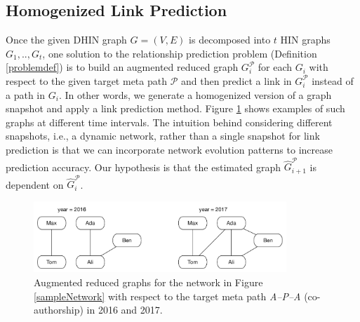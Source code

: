 
\subsection{Homogenized Link Prediction}\label{def:HLP}

Once the given DHIN graph $G=(V,E)$ is decomposed into $t$ HIN graphs $G_1, .., G_t$, one solution to the relationship prediction problem (Definition \ref{problemdef}) is to build an augmented reduced graph $G_i^\mathcal{P}$ for each $G_i$ with respect to the given target meta path $\mathcal{P}$ and then predict a link in $G_i^\mathcal{P}$ instead of a path in $G_i$. In other words, we generate a homogenized version of a graph snapshot and apply a link prediction method. Figure \ref{targetARG} shows examples of such graphs at different time intervals. The intuition behind considering different snapshots, i.e., a dynamic network, rather than a single snapshot for link prediction is that we can incorporate network evolution patterns to increase prediction accuracy. Our hypothesis is that the estimated graph $\hat{G}_{i+1}^\mathcal{P}$ is dependent on $\hat{G}_i^\mathcal{P}$. 

\begin{figure}[t]
\centering
\includegraphics[trim = 0mm 5mm 0mm 0mm,width=0.85\textwidth]{figs/exampletargetARG.pdf}
\caption{Augmented reduced graphs for the network in Figure \ref{sampleNetwork} with respect to the target meta path \textit{A--P--A} (co-authorship) in 2016 and 2017.}\label{targetARG}
\end{figure}


